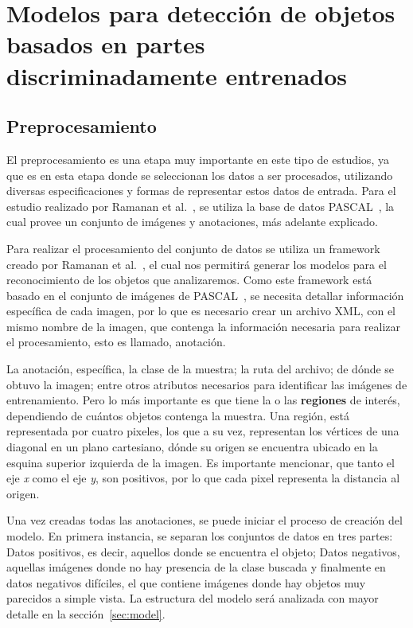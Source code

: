 \chapter[Modelos para detección de objetos basados en partes discriminadamente entrenados ]{Modelos para detección de objetos basados en partes discriminadamente entrenados }\label{ch:capitulo3}

\section{Preprocesamiento}
\label{sec:bdd}

El preprocesamiento es una etapa muy importante en este tipo de estudios, ya que es en esta etapa donde se seleccionan los datos a ser procesados, utilizando diversas especificaciones y formas de representar estos datos de entrada. Para el estudio realizado por Ramanan et al.~\cite{Felzenszwalb2010}, se utiliza la base de datos PASCAL~\cite{Everingham2010}, la cual provee un conjunto de imágenes y anotaciones, más adelante explicado.

Para realizar el procesamiento del conjunto de datos se utiliza un framework creado por Ramanan et al.~\cite{Felzenszwalb2010}, el cual nos permitirá generar los modelos para el reconocimiento de los objetos que analizaremos. Como este framework está basado en el conjunto de imágenes de PASCAL~\cite{Everingham2010}, se necesita detallar información específica de cada imagen, por lo que es necesario crear un archivo XML, con el mismo nombre de la imagen, que contenga la información necesaria para realizar el procesamiento, esto es llamado, anotación.

La anotación, específica, la clase de la muestra; la ruta del archivo; de dónde se obtuvo la imagen; entre otros atributos necesarios para identificar las imágenes de entrenamiento. Pero lo más importante es que tiene la o las \textbf{regiones} de interés, dependiendo de cuántos objetos contenga la muestra.
Una región, está representada por cuatro pixeles, los que a su vez, representan los vértices de una diagonal en un plano cartesiano, dónde su origen se encuentra ubicado en la esquina superior izquierda de la imagen. Es importante mencionar, que tanto el eje \textit{x} como el eje \textit{y}, son positivos, por lo que cada pixel representa la distancia al origen.

Una vez creadas todas las anotaciones, se puede iniciar el proceso de creación del modelo. En primera instancia, se separan los conjuntos de datos en tres partes: Datos positivos, es decir, aquellos donde se encuentra el objeto; Datos negativos, aquellas imágenes donde no hay presencia de la clase buscada y finalmente en datos negativos difíciles, el que contiene imágenes donde hay objetos muy parecidos a simple vista. La estructura del modelo será analizada con mayor detalle en la sección~\ref{sec:model}.

